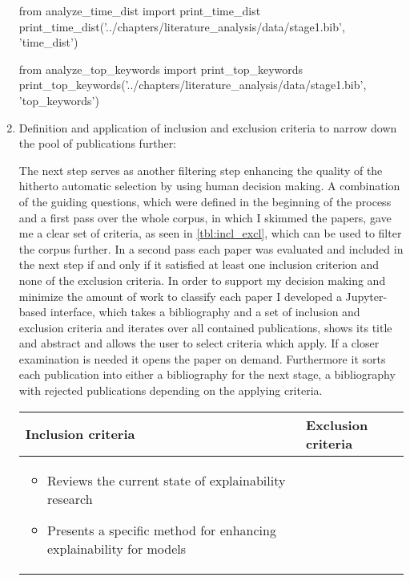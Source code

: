\begin{enumerate}
\begin{pycode}
from analyze_time_dist import print_time_dist
print_time_dist('../chapters/literature_analysis/data/stage1.bib', 'time_dist')
\end{pycode}

\begin{pycode}
from analyze_top_keywords import print_top_keywords
print_top_keywords('../chapters/literature_analysis/data/stage1.bib', 'top_keywords')
\end{pycode}
	
	\item Definition and application of inclusion and exclusion criteria to narrow down the pool of publications further:
	
	The next step serves as another filtering step enhancing the quality of the hitherto automatic selection by using human decision making. A combination of the guiding questions, which were defined in the beginning of the process and a first pass over the whole corpus, in which I skimmed the papers, gave me a clear set of criteria, as seen in \autoref{tbl:incl_excl}, which can be used to filter the corpus further. In a second pass each paper was evaluated and included in the next step if and only if it satisfied at least one inclusion criterion and none of the exclusion criteria.	In order to support my decision making and minimize the amount of work to classify each paper I developed a Jupyter-based interface, which takes a bibliography and a set of inclusion and exclusion criteria and iterates over all contained publications, shows its title and abstract and allows the user to select criteria which apply. If a closer examination is needed it opens the paper on demand. Furthermore it sorts each publication into either a bibliography for the next stage, a bibliography with rejected publications depending on the applying criteria. 
	
	\begin{table}
		\centering
		\begin{tabular}{  p{5cm} | p{5cm} }
			Inclusion criteria & Exclusion criteria  \\ \hline
			
			\begin{itemize}
				\item Reviews the current state of explainability research
				\item Presents a specific method for enhancing explainability for models
			\end{itemize}
			

\end{tabular}
\end{table}
\end{enumerate}
